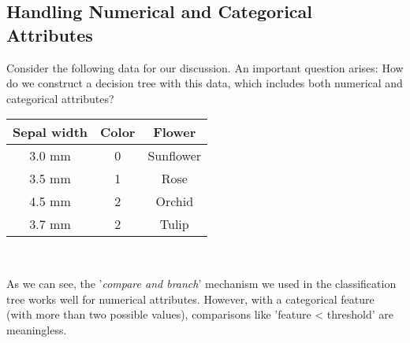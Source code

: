 \documentclass[11pt,a4paper]{report}
\begin{document}
\subsection{Handling Numerical and Categorical Attributes}
Consider the following data for our discussion. An important question arises: How do we construct a decision tree with this data, which includes both numerical and categorical attributes?\\
\begin{center}
\begin{tabular}{ |c|c|c| } 
\hline
Sepal width&Color& Flower\\\hline\hline
3.0 mm & 0 & Sunflower \\\hline
3.5 mm & 1 & Rose \\\hline
4.5 mm & 2 & Orchid\\\hline
3.7 mm & 2 & Tulip\\\hline
\end{tabular}\\
\end{center}
As we can see, the '\textit{compare and branch}' mechanism we used in the classification tree works well for numerical attributes. However, with a categorical feature (with more than two possible values), comparisons like 'feature < threshold' are meaningless.
\end{document}
